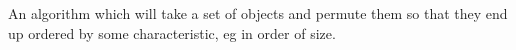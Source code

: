 An algorithm which will take a set of objects and permute them so that
they end up ordered by some characteristic, eg in order of size.